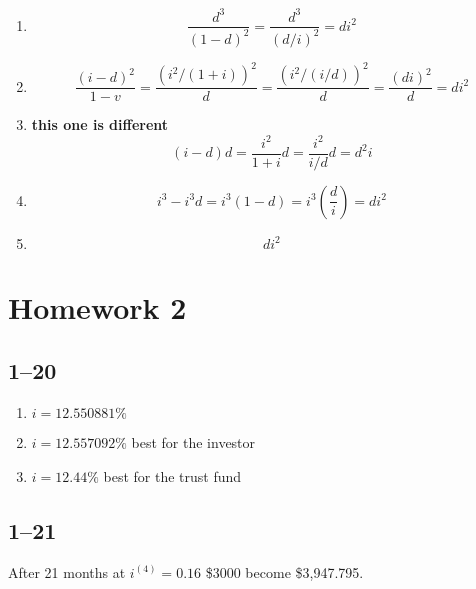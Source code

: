 \documentclass[a4paper, 12pt, reqno]{amsart}
\numberwithin{equation}{section}
\begin{document}
\begin{enumerate}[label=(\alph*)]
    \item \begin{equation}\nonumber
            \frac{d^3}{(1-d)^2} = \frac{d^3}{(d/i)^2} = di^2
        \end{equation}
    \item \begin{equation}\nonumber
            \frac{(i-d)^2}{1-v} = \frac{(i^2/(1+i))^2}{d} = 
                \frac{(i^2/(i/d))^2}{d} = \frac{(di)^2}{d} = di^2
        \end{equation}
    \item \textbf{this one is different}
        \begin{equation}\nonumber
            (i-d)d = \frac{i^2}{1+i}d = \frac{i^2}{i/d}d = d^2i
        \end{equation}
    \item \begin{equation}\nonumber
            i^3-i^3d = i^3(1-d) = i^3(\frac{d}{i}) = di^2
        \end{equation}
    \item \begin{equation}\nonumber
            di^2
        \end{equation}
\end{enumerate}

\newpage
\section*{Homework 2}

\subsection*{1--20}

\begin{enumerate}[label=(\alph*)]
    \item $i = 12.550881\%$
    \item $i = 12.557092\%$ best for the investor
    \item $i = 12.44\%$ best for the trust fund
\end{enumerate}

\subsection*{1--21}

After 21 months at $i^{(4)}=0.16$ \$3000 become \$3,947.795.
\end{document}
